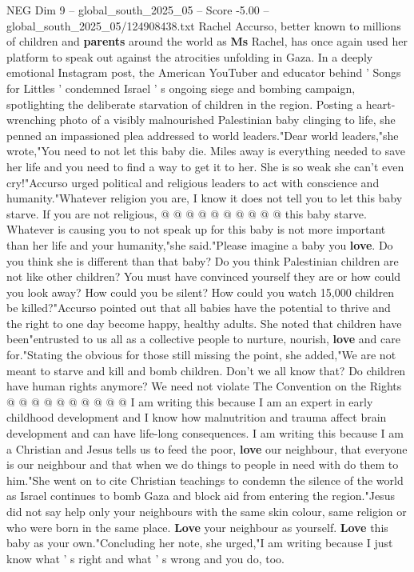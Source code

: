 \begin{textsample}{NEG Dim 9 – global\_south\_2025\_05 – Score -5.00 – global\_south\_2025\_05/124908438.txt}  \label{ex:f9_neg_224}
Rachel Accurso, better known to millions of children and \textbf{parents} around the world as \textbf{Ms} Rachel, has once again used her platform to speak out against the atrocities unfolding in Gaza.
In a deeply emotional Instagram post, the American YouTuber and educator behind ' Songs for Littles ' condemned Israel ' s ongoing siege and bombing campaign, spotlighting the deliberate starvation of children in the region.
Posting a heart-wrenching photo of a visibly malnourished Palestinian baby clinging to life, she penned an impassioned plea addressed to world leaders."Dear world leaders,"she wrote,"You need to not let this baby die.
Miles away is everything needed to save her life and you need to find a way to get it to her.
She is so weak she can't even cry!"Accurso urged political and religious leaders to act with conscience and humanity."Whatever religion you are, I know it does not tell you to let this baby starve.
If you are not religious, @ @ @ @ @ @ @ @ @ @ this baby starve.
Whatever is causing you to not speak up for this baby is not more important than her life and your humanity,"she said."Please imagine a baby you \textbf{love}.
Do you think she is different than that baby?
Do you think Palestinian children are not like other children?
You must have convinced yourself they are or how could you look away?
How could you be silent?
How could you watch 15,000 children be killed?"Accurso pointed out that all babies have the potential to thrive and the right to one day become happy, healthy adults.
She noted that children have been"entrusted to us all as a collective people to nurture, nourish, \textbf{love} and care for."Stating the obvious for those still missing the point, she added,"We are not meant to starve and kill and bomb children.
Don't we all know that?
Do children have human rights anymore?
We need not violate The Convention on the Rights @ @ @ @ @ @ @ @ @ @ I am writing this because I am an expert in early childhood development and I know how malnutrition and trauma affect brain development and can have life-long consequences.
I am writing this because I am a Christian and Jesus tells us to feed the poor, \textbf{love} our neighbour, that everyone is our neighbour and that when we do things to people in need with do them to him."She went on to cite Christian teachings to condemn the silence of the world as Israel continues to bomb Gaza and block aid from entering the region."Jesus did not say help only your neighbours with the same skin colour, same religion or who were born in the same place. \textbf{Love} your neighbour as yourself. \textbf{Love} this baby as your own."Concluding her note, she urged,"I am writing because I just know what ' s right and what ' s wrong and you do, too.

\end{textsample}
